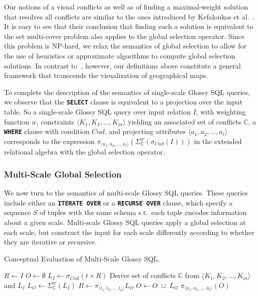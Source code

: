 \documentclass[11pt, oneside]{report}
\begin{document}
Our notions of a visual conflicts as well as of finding a maximal-weight solution that resolves all conflicts are similar to the ones introduced by Kefaloukos et al.~\cite{KefaloukosSZ14:CVL}. It is easy to see that their conclusion that finding such a solution is equivalent to the set multi-cover problem also applies to the global selection operator. Since this problem is NP-hard, we relax the semantics of global selection to allow for the use of heuristics or approximate algorithms to compute global selection solutions. In contrast to~\cite{KefaloukosSZ14:CVL}, however, our definitions above constitute a general framework that transcends the visualization of geographical maps.     

To complete the description of the semantics of single-scale Glossy SQL queries, we observe that the \textbf{\texttt{SELECT}} clause is equivalent to a projection over the input table. So a single-scale Glossy SQL query over input relation $I$, with weighting function $w$, constraints $\langle K_1, K_2, \ldots, K_m\rangle$ yielding an associated set of conflicts $\mathbb{C}$, a \textbf{\texttt{WHERE}} clause with condition $Cnd$, and projecting attributes $\langle a_1, a_2, \ldots, a_l \rangle$ corresponds to the expression $\pi_{\langle a_1, a_2, \ldots, a_l \rangle} (\Sigma_{\mathbb{C}}^{w}(\sigma_{Cnd}(I)))$ in the extended relational algebra with the global selection operator. 
 
\subsubsection{Multi-Scale Global Selection}
\label{sec:semantics:multiscale}

We now turn to the semantics of multi-scale Glossy SQL queries. These queries include either an \textbf{\texttt{ITERATE OVER}} or a \textbf{\texttt{RECURSE OVER}} clause, which specify a sequence $S$ of tuples with the same schema s.t.~each tuple encodes information about a given scale. Multi-scale Glossy SQL queries apply a global selection at each scale, but construct the input for each scale differently according to whether they are iterative or recursive.

\begin{algorithm}
\caption{Conceptual Evaluation of Multi-Scale Glossy SQL.}
\begin{algorithmic}
\STATE $R \leftarrow I$
\STATE $O \leftarrow \emptyset$
\STATE $L_I \leftarrow \sigma_{Cnd}(t \times R)$
\STATE Derive set of conflicts $\mathbb{C}$ from $\langle K_1, K_2, \ldots, K_m\rangle$ and $L_I$
\STATE $L_O \leftarrow \Sigma_{\mathbb{C}}^{w}(L_I)$ 
\STATE $R \leftarrow \pi_{\langle i_1, i_2, \ldots, i_p \rangle} L_O$ 
\ENDIF
\STATE $O \leftarrow O \; \cup \; L_O$
\ENDFOR
\RETURN $\pi_{\langle a_1, a_2, \ldots, a_l \rangle} (O)$
\end{algorithmic}
\label{alg:conceptual:multiscale}
\end{algorithm}
\end{document}
